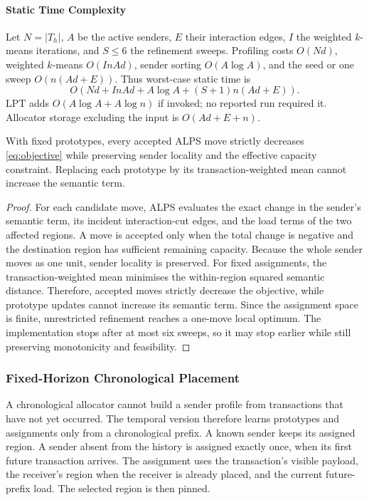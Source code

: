\documentclass[runningheads]{llncs}
\begin{document}
\paragraph{Static Time Complexity}
Let $N=|T_h|$, $A$ be the active senders, $E$ their interaction edges, $I$ the
weighted $k$-means iterations, and $S\leq6$ the refinement sweeps. Profiling
costs $O(Nd)$, weighted $k$-means $O(InAd)$, sender sorting $O(A\log A)$, and
the seed or one sweep $O(n(Ad+E))$. Thus worst-case static time is
\begin{equation}
\label{eq:static_complexity}
O\!\left(Nd + InAd + A\log A + (S+1)n(Ad+E)\right).
\end{equation}
LPT adds $O(A\log A+A\log n)$ if invoked; no reported run required it.
Allocator storage excluding the input is $O(Ad+E+n)$.

\begin{proposition}
With fixed prototypes, every accepted ALPS move strictly decreases
\eqref{eq:objective} while preserving sender locality and the effective
capacity constraint. Replacing each prototype by its transaction-weighted mean
cannot increase the semantic term.
\end{proposition}

\begin{proof}
For each candidate move, ALPS evaluates the exact change in the sender's
semantic term, its incident interaction-cut edges, and the load terms of the
two affected regions. A move is accepted only when the total change is negative
and the destination region has sufficient remaining capacity. Because the
whole sender moves as one unit, sender locality is preserved. For fixed
assignments, the transaction-weighted mean minimises the within-region squared
semantic distance. Therefore, accepted moves strictly decrease the objective,
while prototype updates cannot increase its semantic term. Since the assignment
space is finite, unrestricted refinement reaches a one-move local optimum. The
implementation stops after at most six sweeps, so it may stop earlier while
still preserving monotonicity and feasibility.
\end{proof}

\subsubsection{Fixed-Horizon Chronological Placement}

A chronological allocator cannot build a sender profile from transactions that
have not yet occurred. The temporal version therefore learns prototypes and
assignments only from a chronological prefix. A known sender keeps its assigned
region. A sender absent from the history is assigned exactly once, when its
first future transaction arrives. The assignment uses the transaction's visible
payload, the receiver's region when the receiver is already placed, and the
current future-prefix load. The selected region is then pinned.
\end{document}

